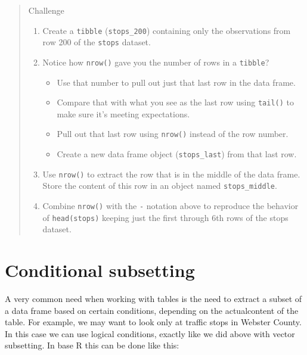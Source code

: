 \documentclass[
]{book}
\providecommand{\tightlist}{%
  \setlength{\itemsep}{0pt}\setlength{\parskip}{0pt}}
\begin{document}
\begin{quote}
Challenge

\begin{enumerate}
\def\labelenumi{\arabic{enumi}.}
\item
  Create a \texttt{tibble} (\texttt{stops\_200}) containing only the observations from
  row 200 of the \texttt{stops} dataset.
\item
  Notice how \texttt{nrow()} gave you the number of rows in a \texttt{tibble}?

  \begin{itemize}
  \tightlist
  \item
    Use that number to pull out just that last row in the data frame.
  \item
    Compare that with what you see as the last row using \texttt{tail()} to make
    sure it's meeting expectations.
  \item
    Pull out that last row using \texttt{nrow()} instead of the row number.
  \item
    Create a new data frame object (\texttt{stops\_last}) from that last row.
  \end{itemize}
\item
  Use \texttt{nrow()} to extract the row that is in the middle of the data
  frame. Store the content of this row in an object named \texttt{stops\_middle}.
\item
  Combine \texttt{nrow()} with the \texttt{-} notation above to reproduce the behavior of
  \texttt{head(stops)} keeping just the first through 6th rows of the stops
  dataset.
\end{enumerate}
\end{quote}

\section{Conditional subsetting}\label{conditional-subsetting-1}

A very common need when working with tables is the need to extract a subset of a data frame based on certain conditions, depending on the actualcontent of the table. For example, we may want to look only at traffic stops in Webster County. In this case we can use logical conditions, exactly like we did above with vector subsetting. In base R this can be done like this:
\end{document}
